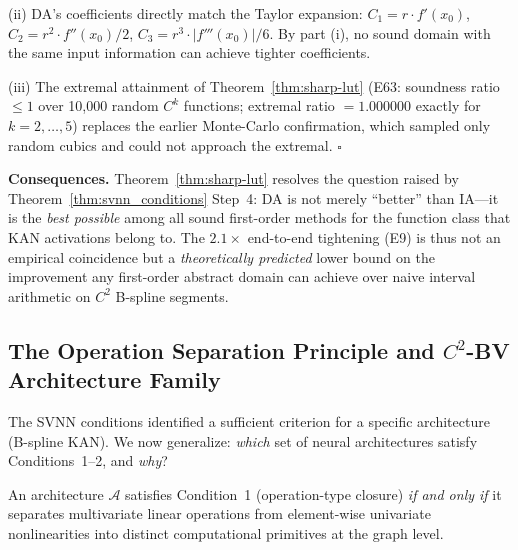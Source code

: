 (ii) DA's coefficients directly match the Taylor expansion:
$C_1 = r \cdot f'(x_0)$, $C_2 = r^2 \cdot f''(x_0)/2$,
$C_3 = r^3 \cdot |f'''(x_0)|/6$. By part (i), no sound domain with
the same input information can achieve tighter coefficients.

(iii) The extremal attainment of Theorem~\ref{thm:sharp-lut}
(E63: soundness ratio $\leq 1$ over 10,000 random $C^k$ functions;
extremal ratio $= 1.000000$ exactly for $k = 2, \dots, 5$)
replaces the earlier Monte-Carlo confirmation, which sampled only
random cubics and could not approach the extremal. $\square$

\vspace{4pt}
\noindent\textbf{Consequences.}
Theorem~\ref{thm:sharp-lut} resolves the question raised by
Theorem~\ref{thm:svnn_conditions} Step~4: DA is not merely ``better''
than IA---it is the \textit{best possible} among all sound first-order
methods for the function class that KAN activations belong to.
The $2.1\times$ end-to-end tightening (E9) is thus not an empirical
coincidence but a \textit{theoretically predicted} lower bound on the
improvement any first-order abstract domain can achieve over naive
interval arithmetic on $C^2$ B-spline segments.





\subsection{The Operation Separation Principle and $C^2$-BV Architecture Family}
\label{sec:c2bv-family}

The SVNN conditions identified a sufficient criterion for a specific
architecture (B-spline KAN). We now generalize: \textit{which} set of
neural architectures satisfy Conditions~1--2, and \textit{why}?

\vspace{4pt}
\begin{proposition}
\label{prop:operation-separation}
An architecture $\mathcal{A}$ satisfies Condition~1 (operation-type
closure) \textit{if and only if} it separates multivariate linear
operations from element-wise univariate nonlinearities into
distinct computational primitives at the graph level.
\end{proposition}

